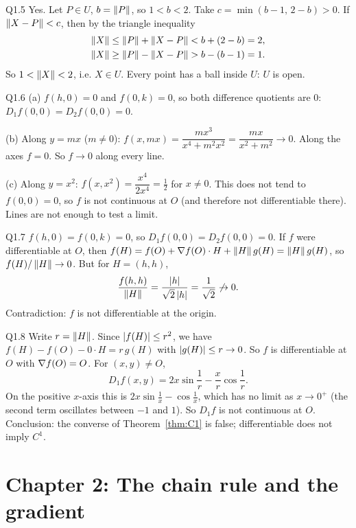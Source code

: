 \begin{solution}{Q1.5}
Yes. Let $P\in U$, $b=\left\lVert P\right\rVert$, so $1<b<2$. Take $c=\min(b-1,\,2-b)>0$. If $\left\lVert X-P\right\rVert<c$, then by the
triangle inequality
\begin{align*} \left\lVert X\right\rVert&\le\left\lVert P\right\rVert+\left\lVert X-P\right\rVert<b+(2-b)=2,\\ \left\lVert X\right\rVert&\ge\left\lVert P\right\rVert-\left\lVert X-P\right\rVert>b-(b-1)=1 . \end{align*}
So $1<\left\lVert X\right\rVert<2$, i.e. $X\in U$. Every point has a ball inside $U$: $U$ is open.
\end{solution}

\begin{solution}{Q1.6}
(a) $f(h,0)=0$ and $f(0,k)=0$, so both difference quotients are $0$: $D_1f(0,0)=D_2f(0,0)=0$.

(b) Along $y=mx$ ($m\neq0$): $f(x,mx)=\dfrac{mx^3}{x^4+m^2x^2}=\dfrac{mx}{x^2+m^2}\to0$. Along the axes
$f=0$. So $f\to0$ along every line.

(c) Along $y=x^2$: $f(x,x^2)=\dfrac{x^4}{2x^4}=\tfrac12$ for $x\neq0$. This does not tend to
$f(0,0)=0$, so $f$ is not continuous at $O$ (and therefore not differentiable there). Lines are not
enough to test a limit.
\end{solution}

\begin{solution}{Q1.7}
$f(h,0)=f(0,k)=0$, so $D_1f(0,0)=D_2f(0,0)=0$. If $f$ were differentiable at $O$, then
$f(H)=f(O)+\nabla f(O)\cdot H+\left\lVert H\right\rVert g(H)=\left\lVert H\right\rVert g(H)$, so $f(H)/\left\lVert H\right\rVert\to0$. But for $H=(h,h)$,
\[ \frac{f(h,h)}{\left\lVert H\right\rVert}=\frac{\left\lvert h\right\rvert}{\sqrt2\left\lvert h\right\rvert}=\frac1{\sqrt2}\not\to0 . \]
Contradiction: $f$ is not differentiable at the origin.
\end{solution}

\begin{solution}{Q1.8}
Write $r=\left\lVert H\right\rVert$. Since $\left\lvert f(H)\right\rvert\le r^2$, we have $f(H)-f(O)-0\cdot H=r\,g(H)$ with
$\left\lvert g(H)\right\rvert\le r\to0$. So $f$ is differentiable at $O$ with $\nabla f(O)=O$. For $(x,y)\neq O$,
\[ D_1f(x,y)=2x\sin\frac1r-\frac xr\cos\frac1r . \]
On the positive $x$-axis this is $2x\sin\frac1x-\cos\frac1x$, which has no limit as $x\to0^+$
(the second term oscillates between $-1$ and $1$). So $D_1f$ is not continuous at $O$. Conclusion:
the converse of Theorem~\ref{thm:C1} is false; differentiable does not imply $C^1$.
\end{solution}

\section{Chapter 2: The chain rule and the gradient}

